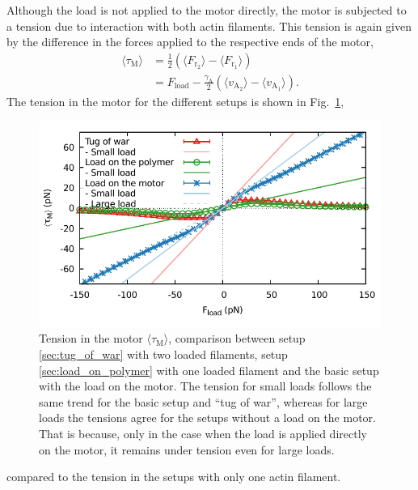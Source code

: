 \documentclass[aps,pre,twocolumn,showpacs,showkeys,superscriptaddress,floatfix]{revtex4-1}
\begin{document}
Although the load is not applied to the motor directly, 
the motor is subjected to a tension due to interaction with both actin filaments. 
This tension is again given by the difference in the forces applied to the respective ends of the motor,
\begin{align}
\langle \tau_\text{M} \rangle
&= \frac{1}{2} \left( \langle F_{\text{r}_2}\rangle - \langle F_{\text{r}_1}\rangle \right) \nonumber \\
&= F_\text{load} - \frac{\gamma_\text{A}}{2} \left(\langle v_{\text{A}_2}\rangle - \langle v_{\text{A}_1}\rangle \right) .
\label{eq:tension_tug}
\end{align}
The tension in the motor for the different setups is shown in Fig.~\ref{fig:tug_F}, 
\begin{figure}[t]
\centering
\includegraphics[width=0.9\linewidth,height=!]{tug_F}
\caption{
\label{fig:tug_F}
Tension in the motor $\langle \tau_\text{M}\rangle$, comparison between setup \ref{sec:tug_of_war} with two loaded filaments, setup \ref{sec:load_on_polymer} with one loaded filament and the basic setup with the load on the motor. 
The tension for small loads follows the same trend for the basic setup and ``tug of war'', whereas for large loads the tensions agree for the setups without a load on the motor. 
That is because, only in the case when the load is applied directly on the motor, it remains under tension even for large loads.
}
\end{figure}
compared to the tension in the setups with only one actin filament.
\end{document}
